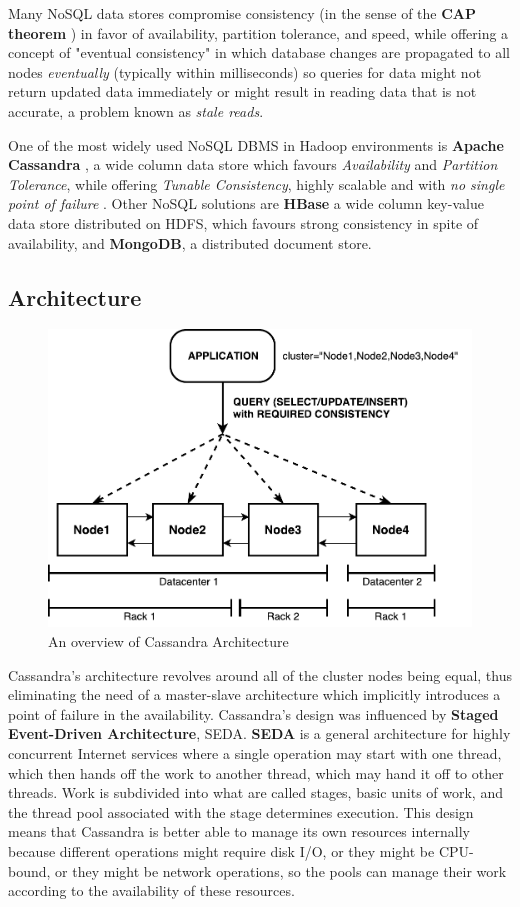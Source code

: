 Many NoSQL data stores compromise consistency (in the sense of the \textbf{CAP theorem} \cite{Gilbert:2002:BCF:564585.564601}) in favor of availability, partition tolerance, and speed, while offering a concept of "eventual consistency" in which database changes are propagated to all nodes \textit{eventually} (typically within milliseconds) so queries for data might not return updated data immediately or might result in reading data that is not accurate, a problem known as \textit{stale reads}.

One of the most widely used NoSQL DBMS in Hadoop environments is \textbf{Apache Cassandra} \cite{CassandraDefinitive}, a wide column data store which favours \textit{Availability} and \textit{Partition Tolerance}, while offering \textit{Tunable Consistency}, highly scalable and with \textit{no single point of failure} \cite{Lakshman:2010:CDS:1773912.1773922}. Other NoSQL solutions are \textbf{HBase} a wide column key-value data store distributed on HDFS, which favours strong consistency in spite of availability, and \textbf{MongoDB}, a distributed document store.

\subsection{Architecture}

\begin{figure}[h]
    \centering
    \includegraphics[width=0.7\linewidth]{Figures/cassandra_arch}
    \caption{An overview of Cassandra Architecture}
    \label{fig:cassandraarch}
\end{figure}


Cassandra's architecture revolves around all of the cluster nodes being equal, thus eliminating the need of a master-slave architecture which implicitly introduces a point of failure in the availability. Cassandra’s design was influenced by \textbf{Staged Event-Driven Architecture}, SEDA. \textbf{SEDA} is a general architecture for highly concurrent Internet services \cite{Welsh:2001:SAW:502059.502057} where a single operation may start with one thread, which then hands off the work to another thread, which may hand it off to other threads. Work is subdivided into what are called stages, basic units of work, and the thread pool associated with the stage determines execution. This design means that Cassandra is better able to manage its own resources internally because different operations might require disk I/O, or they might be CPU-bound, or they might be network operations, so the pools can manage their work according to the availability of these resources.

